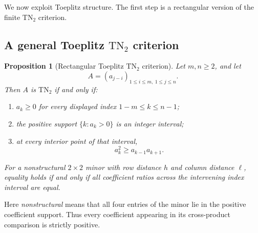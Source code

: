 \documentclass[11pt]{amsart}
\newtheorem{proposition}[theorem]{Proposition}
\theoremstyle{definition}
\theoremstyle{remark}
\newcommand{\TN}{\mathrm{TN}}
\begin{document}
We now exploit Toeplitz structure.  The first step is a rectangular version of the finite $\TN_2$ criterion.

\subsection{A general Toeplitz \texorpdfstring{$\TN_2$}{TN2} criterion}

\begin{proposition}[Rectangular Toeplitz $\TN_2$ criterion]\label{prop:general-TN2}
Let $m,n\ge2$, and let
\[
 A=(a_{j-i})_{1\le i\le m,\ 1\le j\le n}.
\]
Then $A$ is $\TN_2$ if and only if:
\begin{enumerate}
\item $a_k\ge0$ for every displayed index $1-m\le k\le n-1$;
\item the positive support $\{k:a_k>0\}$ is an integer interval;
\item at every interior point of that interval,
\begin{equation}\label{eq:logconcavity}
 a_k^2\ge a_{k-1}a_{k+1}.
\end{equation}
\end{enumerate}
For a nonstructural $2\times2$ minor with row distance $h$ and column distance $\ell$, equality holds if and only if all coefficient ratios across the intervening index interval are equal.
\end{proposition}

Here \emph{nonstructural} means that all four entries of the minor lie in the positive coefficient support.  Thus every coefficient appearing in its cross-product comparison is strictly positive.
\end{document}

